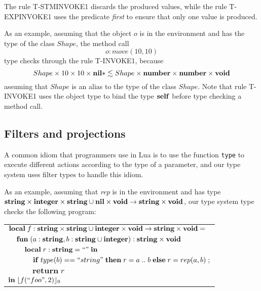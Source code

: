 The rule \textsc{T-STMINVOKE1} discards the produced values,
while the rule \textsc{T-EXPINVOKE1} uses the predicate \emph{first} to
ensure that only one value is produced.

As an example, assuming that the object $o$ is in the environment and
has the type of the class $Shape$, the method call
\[
o{:}move(10, 10)
\]
type checks through the rule \textsc{T-INVOKE1}, because
\[
Shape \times 10 \times 10 \times \mathbf{nil}{*} \lesssim Shape \times \mathbf{number} \times \mathbf{number} \times \mathbf{void}
\]
assuming that $Shape$ is an alias to the type of the class $Shape$.
Note that rule \textsc{T-INVOKE1} uses the object type to bind
the type $\mathbf{self}$ before type checking a method call.

\subsection{Filters and projections}
\label{sec:fap}

A common idiom that programmers use in Lua is to use the function
\texttt{type} to execute different actions according to the type of
a parameter, and our type system uses filter types to handle this idiom.

As an example, assuming that \emph{rep} is in the environment and has type
$\mathbf{string} \times \mathbf{integer} \times \mathbf{string} \cup \mathbf{nil} \times \mathbf{void} \rightarrow \mathbf{string} \times \mathbf{void}$,
our type system type checks the following program:
\begin{center}
\begin{tabular}{llll}
\multicolumn{4}{l}{$\mathbf{local} \; f:\mathbf{string} \times \mathbf{string} \cup \mathbf{integer} \times \mathbf{void} \rightarrow \mathbf{string} \times \mathbf{void} =$}\\
& \multicolumn{3}{l}{$\mathbf{fun} \; (a:\mathbf{string}, b:\mathbf{string} \cup \mathbf{integer}):\mathbf{string} \times \mathbf{void}$}\\
& & \multicolumn{2}{l}{$\mathbf{local} \; r:\mathbf{string} = ``" \; \mathbf{in}$}\\
& & & \multicolumn{1}{l}{$\mathbf{if} \; type(b) == ``string" \; \mathbf{then} \; r = a \;{..}\;b \; \mathbf{else} \; r = rep(a, b)\; ;$}\\
& & & \multicolumn{1}{l}{$\mathbf{return} \; r$}\\
\multicolumn{4}{l}{$\mathbf{in} \; \lfloor f(``foo", 2) \rfloor_{0}$}
\end{tabular}
\end{center}

